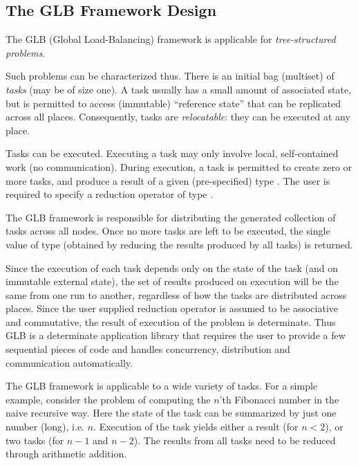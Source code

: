 
\subsection{The GLB Framework Design}
The GLB (Global Load-Balancing) framework is applicable for {\em
  tree-structured problems}. 

Such problems can be characterized thus. There is an initial
bag (multiset) of {\em tasks} (may be of size one). A task usually has a
small amount of associated state, but is permitted to access
(immutable) ``reference state''  that can be replicated across all
places. Consequently, tasks are {\em relocatable}: they can be
executed at any place. 

Tasks can be executed. Executing a task may only involve local,
self-contained work (no communication). During execution, a task is
permitted to create zero or more tasks, and produce a result of a given
(pre-specified) type . The user is required to specify a
reduction operator of type . 

The GLB framework is responsible for distributing the generated
collection of tasks across all nodes. Once no more tasks are left to
be executed, the single value of type  (obtained by reducing
the results produced by all tasks) is returned.  

Since the execution of each task depends only on the state of the
task (and on immutable external state), the set of results produced on
execution will be the same from one run to another, regardless of
how the tasks are distributed across places. Since the user supplied
reduction operator is assumed to be associative and commutative, the
result of execution of the problem is determinate. Thus GLB is a
determinate application library that requires the user to provide a
few sequential pieces of code and handles concurrency, distribution
and communication automatically. 

The GLB framework is applicable to a wide variety of tasks. For a
simple example, consider the problem of computing the $n$'th Fibonacci
number in the naive recursive way. Here the state of the task can be
summarized by just one number (long), i.e.{} $n$. Execution of the
task yields either a result (for $n < 2$), or two tasks (for $n-1$ and
$n-2$). The results from all tasks need to be reduced through
arithmetic addition. 


